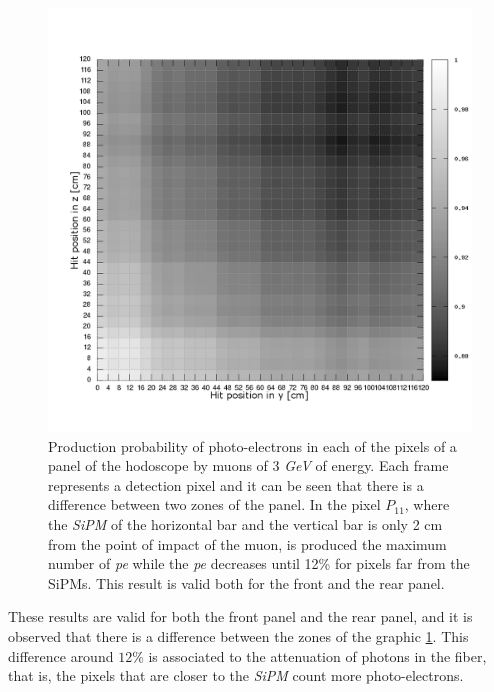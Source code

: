 \documentclass[submitting]{nst}
\begin{document}
\begin{figure}[h!]
    \centering
        \includegraphics[scale=0.3]{Figures/atenuacion_panel_bw.png}
   \caption[Response of the hodoscope panels]{Production probability of photo-electrons in each of the pixels of a panel of the hodoscope by muons of 3   \textsl{GeV}  of energy. Each frame represents a detection pixel and it can be seen that there is a difference between two zones of the panel. In the pixel $P_{11}$, where the \textsl{SiPM} of the horizontal bar and the vertical bar is only 2 cm from the point of impact of the muon, is produced the maximum number of \textsl{pe} while the \textsl{pe} decreases until 12\% for pixels far from the SiPMs. This result is valid both for the front and the rear panel.}\label{atenuacion_panel_bw}
\end{figure}


These results are valid for both the front panel and the rear panel, and it is observed that there is a difference between the zones of the graphic \ref{atenuacion_panel_bw}. This difference around $12$\% is associated to the attenuation of photons in the fiber, that is, the pixels that are closer to the \textsl{SiPM} count more photo-electrons. 


\end{document}
